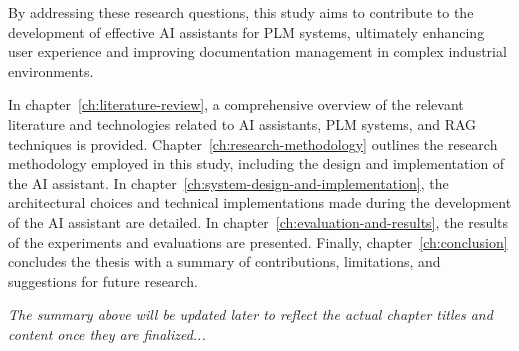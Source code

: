 By addressing these research questions, this study aims to contribute to the development of effective AI assistants for PLM systems, ultimately enhancing user experience and improving documentation management in complex industrial environments.

In chapter~\ref{ch:literature-review}, a comprehensive overview of the relevant literature and technologies related to AI assistants, PLM systems, and RAG techniques is provided. Chapter~\ref{ch:research-methodology} outlines the research methodology employed in this study, including the design and implementation of the AI assistant. In chapter~\ref{ch:system-design-and-implementation}, the architectural choices and technical implementations made during the development of the AI assistant are detailed. In chapter~\ref{ch:evaluation-and-results}, the results of the experiments and evaluations are presented. Finally, chapter~\ref{ch:conclusion} concludes the thesis with a summary of contributions, limitations, and suggestions for future research.


\textit{The summary above will be updated later to reflect the actual chapter titles and content once they are finalized...}
